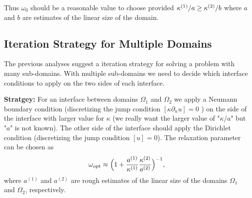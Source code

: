 \documentclass[11pt]{article}
\begin{document}
Thus $\omega_0$ should be a reasonable value to choose provided $\kappa^{(1)}/a \ge \kappa^{(2)}/b$  where $a$ and 
$b$ are estimates of the linear size of the domain. 





\clearpage
\subsection{Iteration Strategy for Multiple Domains}

\newcommand{\aI}{a^{(1)}}
\newcommand{\aII}{a^{(2)}}

The previous analyses suggest a iteration strategy for solving a problem with many sub-domains. 
With multiple sub-domains we need to decide which interface conditions to apply on the two sides of each interface.

{\bf Stratgey:} For an interface between domains $\Omega_1$ and $\Omega_2$ we apply a Neumann boundary condition 
(discretizing the jump condition $[\kappa \partial_n u]=0$ ) on the side of the 
interface with larger value for $\kappa$ (we really want the larger value of "$\kappa/a$" but "$a$" is
not known). The other side of the interface should apply the Dirichlet condition (discretizing the
jump condition $[u]=0$). The relaxation parameter can be chosen as 
\[
 \omega_{\rm opt} \approx \Big(1+\frac{\aI}{\kappaI}\frac{\kappaII}{\aII} \Big)^{-1} , 
\]
where $\aI$ and $\aII$ are rough estimates of the linear size of the domains $\Omega_1$ and $\Omega_2$, respectively. 
\end{document}
